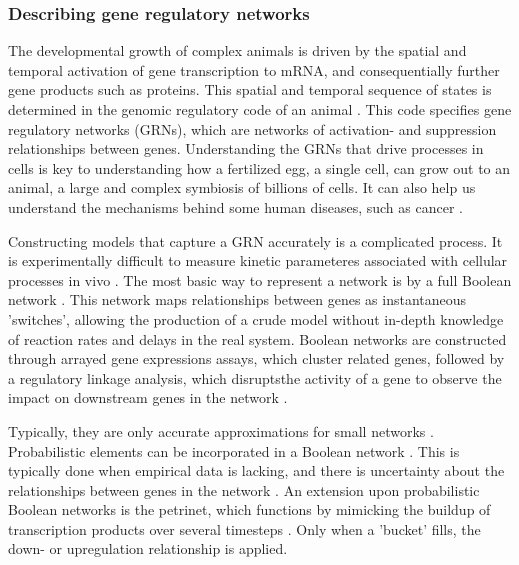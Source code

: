 \documentclass[../main.tex]{subfiles}
\begin{document}
\subsubsection{Describing gene regulatory networks}

The developmental growth of complex animals is driven by the spatial and temporal activation of gene transcription to mRNA, and consequentially further gene products such as proteins.
This spatial and temporal sequence of states is determined in the genomic regulatory code of an animal \cite{bolouri2002modeling, kuhn2009monte}.
This code specifies gene regulatory networks (GRNs), which are networks of activation- and suppression relationships between genes.
Understanding the GRNs that drive processes in cells is key to understanding how a fertilized egg, a single cell, can grow out to an animal, a large and complex symbiosis of billions of cells.
It can also help us understand the mechanisms behind some human diseases, such as cancer \cite{qian2008inference}.

Constructing models that capture a GRN accurately is a complicated process.
It is experimentally difficult to measure kinetic parameteres associated with cellular processes in vivo \cite{bolouri2002modeling}.
The most basic way to represent a network is by a full Boolean network \cite{bolouri2002modeling}.
This network maps relationships between genes as instantaneous 'switches', allowing the production of a crude model without in-depth knowledge of reaction rates and delays in the real system.
Boolean networks are constructed through arrayed gene expressions assays, which cluster related genes, followed by a regulatory linkage analysis, which disruptsthe activity of a gene to observe the impact on downstream genes in the network \cite{bolouri2002modeling, wu2013high}.

Typically, they are only accurate approximations for small networks \cite{karlebach2008modelling}.
Probabilistic elements can be incorporated in a Boolean network \cite{schlitt2007current}.
This is typically done when empirical data is lacking, and there is uncertainty about the relationships between genes in the network \cite{karlebach2008modelling}.
An extension upon probabilistic Boolean networks is the petrinet, which functions by mimicking the buildup of transcription products over several timesteps \cite{karlebach2008modelling}.
Only when a 'bucket' fills, the down- or upregulation relationship is applied.
\end{document}
